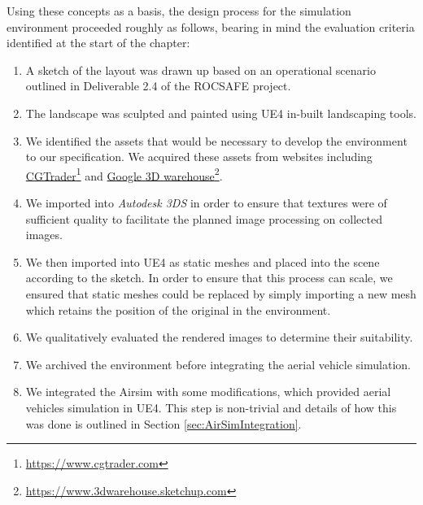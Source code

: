 Using these concepts as a basis, the design process for the simulation environment proceeded roughly as follows, bearing in mind the evaluation criteria identified at the start of the chapter:
\begin{enumerate}
    \item A sketch of the layout was drawn up based on an operational scenario outlined in Deliverable 2.4 of the ROCSAFE project.
    \item The landscape was sculpted and painted using UE4 in-built landscaping tools.
    \item We identified the assets that would be necessary to develop the environment to our specification. We acquired these assets from websites including 
\href{http://www.cgtrader.com}{CGTrader}\footnote{\href {http://www.cgtrader.com}{https://www.cgtrader.com}}
and 
\href{https://3dwarehouse.sketchup.com/?hl=en}{Google 3D warehouse}\footnote{\href {https://3dwarehouse.sketchup.com/?hl=en}{https://www.3dwarehouse.sketchup.com}}.
\item We imported into \emph{Autodesk 3DS} in order to ensure that textures were of sufficient quality to facilitate the planned image processing on collected images.
\item We then imported into UE4 as static meshes and placed into the scene according to the sketch. In order to ensure that this process can scale, we ensured that static meshes could be replaced by simply importing a new mesh which retains the position of the original in the environment. 
\item We qualitatively evaluated the rendered images to determine their suitability.
\item We archived the environment before integrating the aerial vehicle simulation.
\item We integrated the Airsim \cite{Shah2017AirSim:Vehicles} with some modifications, which provided aerial vehicles simulation in UE4. This step is non-trivial and details of how this was done is outlined in Section \ref{sec:AirSimIntegration}.
\end{enumerate} 


